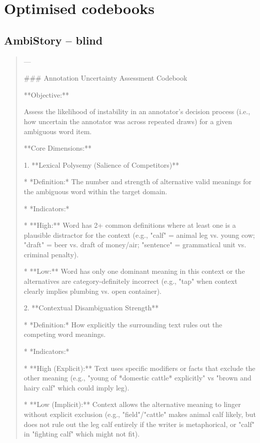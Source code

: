 \section{Optimised codebooks}
\label{app:codebooks}
\subsection*{AmbiStory -- blind}
\begin{quote}\small
---

### Annotation Uncertainty Assessment Codebook



**Objective:**

Assess the likelihood of instability in an annotator's decision process (i.e., how uncertain the annotator was across repeated draws) for a given ambiguous word item.



**Core Dimensions:**



1.  **Lexical Polysemy (Salience of Competitors)**

    *   *Definition:* The number and strength of alternative valid meanings for the ambiguous word within the target domain.

    *   *Indicators:*

        *   **High:** Word has 2+ common definitions where at least one is a plausible distractor for the context (e.g., "calf" = animal leg vs. young cow; "draft" = beer vs. draft of money/air; "sentence" = grammatical unit vs. criminal penalty).

        *   **Low:** Word has only one dominant meaning in this context or the alternatives are category-definitely incorrect (e.g., "tap" when context clearly implies plumbing vs. open container).



2.  **Contextual Disambiguation Strength**

    *   *Definition:* How explicitly the surrounding text rules out the competing word meanings.

    *   *Indicators:*

        *   **High (Explicit):** Text uses specific modifiers or facts that exclude the other meaning (e.g., "young of *domestic cattle* explicitly" vs "brown and hairy calf" which could imply leg).

        *   **Low (Implicit):** Context allows the alternative meaning to linger without explicit exclusion (e.g., "field"/"cattle" makes animal calf likely, but does not rule out the leg calf entirely if the writer is metaphorical, or "calf" in "fighting calf" which might not fit).




\end{quote}
